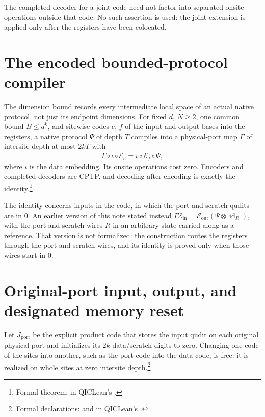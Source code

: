 \documentclass{article}
\begin{document}
The completed decoder for a joint code need not factor into separated
onsite operations outside that code. No such assertion is used: the joint
extension is applied only after the registers have been colocated.

\section{The encoded bounded-protocol compiler}
The dimension bound records every intermediate local space of an actual
native protocol, not just its endpoint dimensions. For fixed $d$, $N\geq2$,
one common bound $B\le d^k$, and sitewise codes $e$, $f$ of the input and
output bases into the registers, a native protocol $\Psi$ of depth $T$
compiles into a physical-port map $\Gamma$ of intersite depth at most $2kT$
with
\begin{align}
    \Gamma\circ\iota\circ\mathcal E_e
    =\iota\circ\mathcal E_f\circ\Psi,
\end{align}
where $\iota$ is the data embedding. Its onsite operations cost zero.
Encoders and completed decoders are CPTP, and decoding after encoding is
exactly the identity.\footnote{Formal theorem:
     in QICLean's
    .}

The identity concerns inputs in the code, in which the port and scratch
qudits are in $0$. An earlier version of this note stated instead
$\Gamma\mathcal E_{\mathrm{in}}=\mathcal E_{\mathrm{out}}(\Psi\otimes\operatorname{id}_R)$,
with the port and scratch wires $R$ in an arbitrary state carried along as a
reference. That version is not formalized: the construction routes the
registers through the port and scratch wires, and its identity is proved
only when those wires start in $0$.

\section{Original-port input, output, and designated memory reset}
Let $J_{\mathrm{port}}$ be the explicit product code that stores the input
qudit on each original physical port and initializes its $2k$ data/scratch
digits to zero. Changing one code of the sites into another, such as the
port code into the data code, is free: it is realized on whole sites at
zero intersite depth.\footnote{Formal declarations:
     and
     in QICLean's
    .}
\end{document}
